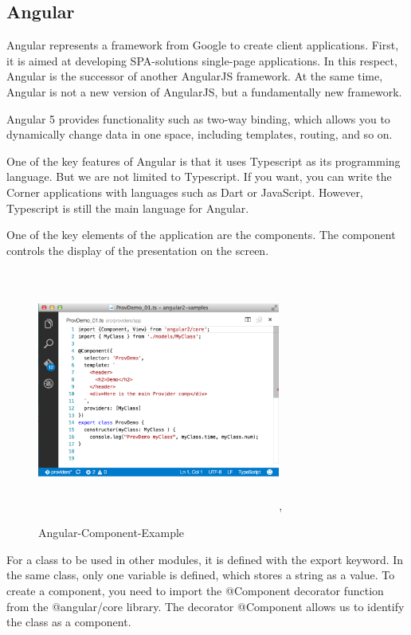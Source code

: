 \documentclass[12pt,a4paper,oneside,openany]{book}
\begin{document}
\subsection{Angular}
Angular represents a framework from Google to create client applications. First, it is aimed at developing SPA-solutions single-page applications. In this respect, Angular is the successor of another AngularJS framework. At the same time, Angular is not a new version of AngularJS, but a fundamentally new framework.

Angular 5 provides functionality such as two-way binding, which allows you to dynamically change data in one space, including templates, routing, and so on.

One of the key features of Angular is that it uses Typescript as its programming language. But we are not limited to Typescript. If you want, you can write the Corner applications with languages such as Dart or JavaScript. However, Typescript is still the main language for Angular.

One of the key elements of the application are the components. The component controls the display of the presentation on the screen. \cite{angular} \\

\begin{figure}[ht]
\renewcommand\thefigure{4.2}
\centering
\includegraphics[width=8cm, height=8cm]{Images/angular.png},
\caption{Angular-Component-Example}
\label{angular}
\end{figure} 

For a class to be used in other modules, it is defined with the export keyword. In the same class, only one variable is defined, which stores a string as a value. To create a component, you need to import the @Component decorator
function from the @angular/core library. The decorator @Component allows us to identify the class as a component.
\end{document}
